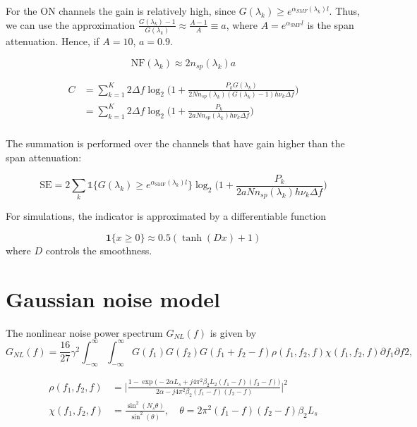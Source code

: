 \documentclass[a4paper]{article}
\begin{document}
For the ON channels the gain is relatively high, since $G(\lambda_k) \geq e^{\alpha_{SMF}(\lambda_k)l}$. Thus, we can use the approximation $\frac{G(\lambda_k)-1}{G(\lambda_k)} \approx \frac{A-1}{A} \equiv a$, where $A = e^{\alpha_{\text{SMF}}l}$ is the span attenuation. Hence, if $A = 10$, $a = 0.9$. 

\begin{equation} \label{eq:NF}
\mathrm{NF}(\lambda_k) \approx 2n_{sp}(\lambda_k)a
\end{equation}

\begin{align} \nonumber
C &= \sum_{k = 1}^{K} 2\Delta f\log_2\Bigg(1 + \frac{P_kG(\lambda_k)}{2Nn_{sp}(\lambda_k)(G(\lambda_k) - 1)h\nu_k\Delta f}\Bigg) \\
&= \sum_{k = 1}^{K} 2\Delta f\log_2\Bigg(1 + \frac{P_k}{2aNn_{sp}(\lambda_k)h\nu_k\Delta f}\Bigg) \\
\end{align}


The summation is performed over the channels that have gain higher than the span attenuation:

\begin{equation}
\mathrm{SE} =2\sum_{k} \mathds{1}\{G(\lambda_k) \geq e^{\alpha_{\text{SMF}}(\lambda_k)l}\}\log_2\bigg(1 + \frac{P_k}{2aNn_{sp}(\lambda_k)h\nu_k\Delta f}\bigg) 
\end{equation}

For simulations, the indicator is approximated by a differentiable function

\begin{equation}
	\bm{1}\{x \geq 0\} \approx 0.5(\tanh(Dx) + 1)
\end{equation}
where $D$ controls the smoothness.

\section{Gaussian noise model}

The nonlinear noise power spectrum $G_{NL}(f)$ is given by \cite{Poggiolini2012}
\begin{equation}
	G_{NL}(f) = \frac{16}{27}\gamma^2\int_{-\infty}^{\infty}\int_{-\infty}^{\infty}G(f_1)G(f_2)G(f_1+f_2-f)\rho(f_1, f_2, f)\chi(f_1, f_2, f)\partial f_1\partial f2,
\end{equation}

\begin{align}
	\rho(f_1, f_2, f) &= \Bigg|\frac{1 - \exp\Big(-2\alpha L_s + j4\pi^2\beta_2L_2(f_1-f)(f_2-f)\Big)}{2\alpha - j4\pi^2\beta_2(f_1-f)(f_2-f)}\Bigg|^2 \\
	\chi(f_1, f_2, f) &= \frac{\sin^2(N_s\theta)}{\sin^2(\theta)}, \quad \theta = 2\pi^2(f_1-f)(f_2-f)\beta_2L_s
\end{align}
\end{document}
